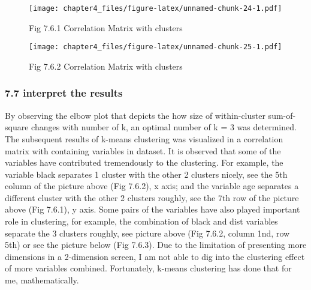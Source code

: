 \documentclass[
]{article}
\newenvironment{Shaded}{\begin{snugshade}}{\end{snugshade}}
\newcommand{\AttributeTok}[1]{\textcolor[rgb]{0.77,0.63,0.00}{#1}}
\newcommand{\DecValTok}[1]{\textcolor[rgb]{0.00,0.00,0.81}{#1}}
\newcommand{\FunctionTok}[1]{\textcolor[rgb]{0.00,0.00,0.00}{#1}}
\newcommand{\NormalTok}[1]{#1}
\newcommand{\SpecialCharTok}[1]{\textcolor[rgb]{0.00,0.00,0.00}{#1}}
\begin{document}
\begin{figure}
\centering
\texttt{[image: chapter4\_files/figure-latex/unnamed-chunk-24-1.pdf]}
\caption{Fig 7.6.1 Correlation Matrix with clusters}
\end{figure}

\begin{Shaded}
\end{Shaded}

\begin{figure}
\centering
\texttt{[image: chapter4\_files/figure-latex/unnamed-chunk-25-1.pdf]}
\caption{Fig 7.6.2 Correlation Matrix with clusters}
\end{figure}

\hypertarget{interpret-the-results}{%
\subsubsection{7.7 interpret the results}\label{interpret-the-results}}

By observing the elbow plot that depicts the how size of within-cluster
sum-of-square changes with number of k, an optimal number of k = 3 was
determined. The subsequent results of k-means clustering was visualized
in a correlation matrix with containing variables in dataset. It is
observed that some of the variables have contributed tremendously to the
clustering. For example, the variable black separates 1 cluster with the
other 2 clusters nicely, see the 5th column of the picture above (Fig
7.6.2), x axis; and the variable age separates a different cluster with
the other 2 clusters roughly, see the 7th row of the picture above (Fig
7.6.1), y axis. Some pairs of the variables have also played important
role in clustering, for example, the combination of black and dist
variables separate the 3 clusters roughly, see picture above (Fig 7.6.2,
column 1nd, row 5th) or see the picture below (Fig 7.6.3). Due to the
limitation of presenting more dimensions in a 2-dimension screen, I am
not able to dig into the clustering effect of more variables combined.
Fortunately, k-means clustering has done that for me, mathematically.
\end{document}

